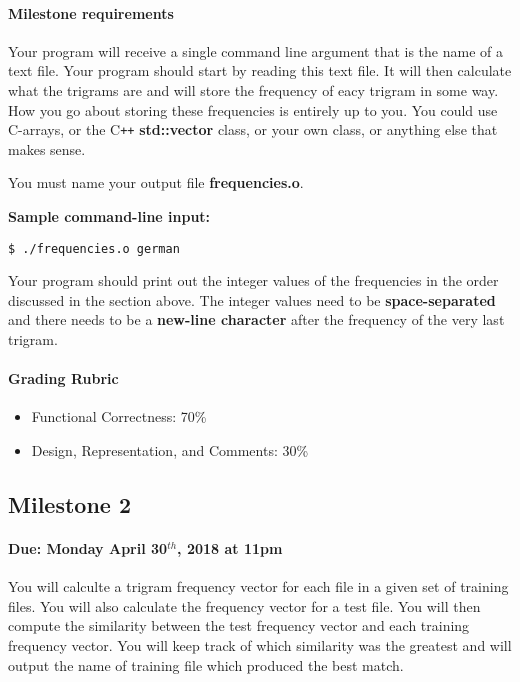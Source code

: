\documentclass[]{article}
\providecommand{\tightlist}{%
  \setlength{\itemsep}{0pt}\setlength{\parskip}{0pt}}
\let\oldparagraph\paragraph
\renewcommand{\paragraph}[1]{\oldparagraph{#1}\mbox{}}
\begin{document}
\paragraph{Milestone requirements}\label{milestone-requirements}

Your program will receive a single command line argument that is the
name of a text file. Your program should start by reading this text
file. It will then calculate what the trigrams are and will store the
frequency of eacy trigram in some way. How you go about storing these
frequencies is entirely up to you. You could use C-arrays, or the C\texttt{++}
\textbf{std::vector} class, or your own class, or anything else that
makes sense.

You must name your output file \textbf{frequencies.o}.

\textbf{Sample command-line input:}

\texttt{\$ ./frequencies.o german}

Your program should print out the integer values of the frequencies in
the order discussed in the section above. The integer values need to be
\textbf{space-separated} and there needs to be a \textbf{new-line
character} after the frequency of the very last trigram.

\paragraph{Grading Rubric}\label{grading-rubric}

\begin{itemize}
\tightlist
\item
  Functional Correctness: 70\%
\item
  Design, Representation, and Comments: 30\%
\end{itemize}

\subsection{Milestone 2}\label{milestone-2}

\paragraph{\texorpdfstring{Due: Monday April 30$^{th}$, 2018 at
11pm}{Due: Monday April 30$^{th}$, 2018 at 11pm}}\label{due-monday-april-30th-2018-at-11pm}

You will calculte a trigram frequency vector for each file in a given
set of training files. You will also calculate the frequency vector for
a test file. You will then compute the similarity between the test
frequency vector and each training frequency vector. You will keep track
of which similarity was the greatest and will output the name of
training file which produced the best match.
\end{document}
